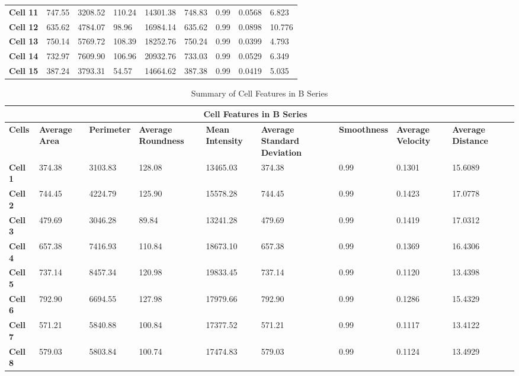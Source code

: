 \documentclass{article}
\begin{document}
\begin{table}[h!]
\begin{tabular}{|p{1.2cm}|p{1.5cm}|p{1.5cm}|p{1.5cm}|p{1.7cm}|p{1.5cm}|p{1.7cm}|p{1.5cm}|p{1.7cm}|}
\textbf{Cell 11} & 747.55 & 3208.52 & 110.24 & 14301.38 & 748.83 & 0.99 & 0.0568 & 6.823 \\
\textbf{Cell 12} & 635.62 & 4784.07 & 98.96 & 16984.14 & 635.62 & 0.99 & 0.0898 & 10.776 \\
\textbf{Cell 13} & 750.14 & 5769.72 & 108.39 & 18252.76 & 750.24 & 0.99 & 0.0399 & 4.793 \\
\textbf{Cell 14} & 732.97 & 7609.90 & 106.96 & 20932.76 & 733.03 & 0.99 & 0.0529 & 6.349 \\
\textbf{Cell 15} & 387.24 & 3793.31 & 54.57 & 14664.62 & 387.38 & 0.99 & 0.0419 & 5.035 \\
\hline
\end{tabular}
\end{table}



\begin{table}[h!]
\centering
\caption{Summary of Cell Features in B Series}\label{table:SummaryCellFeatures-SeriesB}
\begin{tabular}{ |p{1.2cm}|p{1.5cm}|p{1.5cm}|p{1.7cm}|p{1.7cm}|p{1.7cm}|p{1.7cm}|p{1.7cm}|p{1.7cm}|p{1.7cm}| }
\hline
\multicolumn{9}{|c|}{\textbf{Cell Features in B Series}} \\
\hline
\textbf{Cells} & \textbf{Average Area} & \textbf{Perimeter} & \textbf{Average Roundness} & \textbf{Mean Intensity} & \textbf{Average Standard Deviation} & \textbf{Smoothness} & \textbf{Average Velocity} & \textbf{Average Distance} \\
\hline
\textbf{Cell 1} & 374.38 & 3103.83 & 128.08 & 13465.03 & 374.38 & 0.99 & 0.1301 & 15.6089\\
\textbf{Cell 2} & 744.45 & 4224.79 & 125.90 & 15578.28 & 744.45 & 0.99 & 0.1423 & 17.0778 \\
\textbf{Cell 3} & 479.69 & 3046.28 & 89.84 & 13241.28 & 479.69 & 0.99 & 0.1419 & 17.0312 \\
\textbf{Cell 4} & 657.38 & 7416.93 & 110.84 & 18673.10 & 657.38 & 0.99 & 0.1369 & 16.4306 \\
\textbf{Cell 5} & 737.14 & 8457.34 & 120.98 & 19833.45 & 737.14 & 0.99 & 0.1120 & 13.4398\\
\textbf{Cell 6} & 792.90 & 6694.55 & 127.98 & 17979.66 & 792.90 & 0.99 & 0.1286 & 15.4329\\
\textbf{Cell 7} & 571.21 & 5840.88 & 100.84 & 17377.52 & 571.21 & 0.99 & 0.1117 & 13.4122\\
\textbf{Cell 8} & 579.03 & 5803.84 & 100.74 & 17474.83 & 579.03 & 0.99 & 0.1124 & 13.4929\\

\end{tabular}
\end{table}
\end{document}
